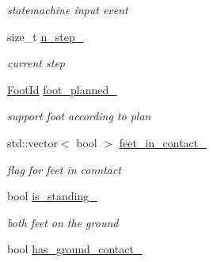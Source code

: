 \begin{DoxyCompactItemize}
\begin{DoxyCompactList}\small\item\em statemachine input event \end{DoxyCompactList}\item 
size\+\_\+t \hyperlink{classow__core_1_1Flags_a455fdf14ae26d3589d7578a294825879}{n\+\_\+step\+\_\+}\hypertarget{classow__core_1_1Flags_a455fdf14ae26d3589d7578a294825879}{}\label{classow__core_1_1Flags_a455fdf14ae26d3589d7578a294825879}

\begin{DoxyCompactList}\small\item\em current step \end{DoxyCompactList}\item 
\hyperlink{foot__id_8h_a57e66d30579b22cfe2c17c739278e5a6}{Foot\+Id} \hyperlink{classow__core_1_1Flags_a2f04779ea82d398811932eafe472210f}{foot\+\_\+planned\+\_\+}\hypertarget{classow__core_1_1Flags_a2f04779ea82d398811932eafe472210f}{}\label{classow__core_1_1Flags_a2f04779ea82d398811932eafe472210f}

\begin{DoxyCompactList}\small\item\em support foot according to plan \end{DoxyCompactList}\item 
std\+::vector$<$ bool $>$ \hyperlink{classow__core_1_1Flags_a3b842af05d453319f9adde251c27bc0b}{feet\+\_\+in\+\_\+contact\+\_\+}\hypertarget{classow__core_1_1Flags_a3b842af05d453319f9adde251c27bc0b}{}\label{classow__core_1_1Flags_a3b842af05d453319f9adde251c27bc0b}

\begin{DoxyCompactList}\small\item\em flag for feet in conntact \end{DoxyCompactList}\item 
bool \hyperlink{classow__core_1_1Flags_a3e554e8564759b6ea5d8ed35f1ad1172}{is\+\_\+standing\+\_\+}\hypertarget{classow__core_1_1Flags_a3e554e8564759b6ea5d8ed35f1ad1172}{}\label{classow__core_1_1Flags_a3e554e8564759b6ea5d8ed35f1ad1172}

\begin{DoxyCompactList}\small\item\em both feet on the ground \end{DoxyCompactList}\item 
bool \hyperlink{classow__core_1_1Flags_ac155838b2c656fc64f178f614b6b88ed}{has\+\_\+ground\+\_\+contact\+\_\+}\hypertarget{classow__core_1_1Flags_ac155838b2c656fc64f178f614b6b88ed}{}\label{classow__core_1_1Flags_ac155838b2c656fc64f178f614b6b88ed}


\end{DoxyCompactItemize}
